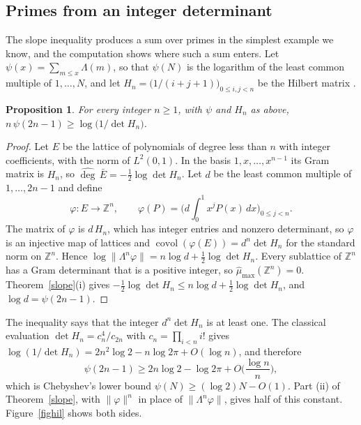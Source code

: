 \documentclass[11pt,letterpaper]{article}
\newtheorem{proposition}[theorem]{Proposition}
\numberwithin{equation}{section}
\begin{document}
\subsection{Primes from an integer determinant}\label{sec:cheb}

The slope inequality produces a sum over primes in the simplest example we know, and the computation shows where such a sum enters. Let $\psi(x)=\sum_{m\le x}\Lambda(m)$, so that $\psi(N)$ is the logarithm of the least common multiple of $1,\dots,N$, and let $H_n=\big(1/(i+j+1)\big)_{0\le i,j<n}$ be the Hilbert matrix \cite{hilbert}.

\begin{proposition}\label{cheb}
For every integer $n\ge1$, with $\psi$ and $H_n$ as above, $n\,\psi(2n-1)\ge\log\big(1/\det H_n\big)$.
\end{proposition}
\begin{proof}
Let $E$ be the lattice of polynomials of degree less than $n$ with integer coefficients, with the norm of $L^2(0,1)$. In the basis $1,x,\dots,x^{n-1}$ its Gram matrix is $H_n$, so $\widehat{\deg}\,\bar E=-\tfrac12\log\det H_n$. Let $d$ be the least common multiple of $1,\dots,2n-1$ and define
\[
\varphi\colon E\to\mathbb Z^n,\qquad\varphi(P)=\Big(d\int_0^1x^jP(x)\,dx\Big)_{0\le j<n}.
\]
The matrix of $\varphi$ is $d\,H_n$, which has integer entries and nonzero determinant, so $\varphi$ is an injective map of lattices and $\operatorname{covol}(\varphi(E))=d^n\det H_n$ for the standard norm on $\mathbb Z^n$. Hence $\log\|\Lambda^n\varphi\|=n\log d+\tfrac12\log\det H_n$. Every sublattice of $\mathbb Z^n$ has a Gram determinant that is a positive integer, so $\hat\mu_{\max}(\mathbb Z^n)=0$. Theorem~\ref{slope}(i) gives $-\tfrac12\log\det H_n\le n\log d+\tfrac12\log\det H_n$, and $\log d=\psi(2n-1)$.
\end{proof}

The inequality says that the integer $d^n\det H_n$ is at least one. The classical evaluation $\det H_n=c_n^4/c_{2n}$ with $c_n=\prod_{i<n}i!$ gives $\log(1/\det H_n)=2n^2\log2-n\log2\pi+O(\log n)$, and therefore
\[
\psi(2n-1)\ge2n\log2-\log2\pi+O\Big(\frac{\log n}{n}\Big),
\]
which is Chebyshev's lower bound $\psi(N)\ge(\log2)N-O(1)$. Part (ii) of Theorem~\ref{slope}, with $\|\varphi\|^n$ in place of $\|\Lambda^n\varphi\|$, gives half of this constant. Figure~\ref{fighil} shows both sides.
\end{document}
